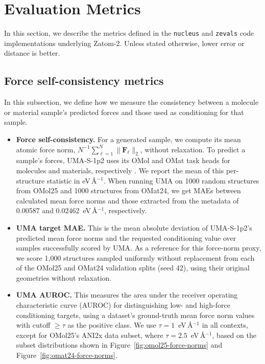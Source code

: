 \documentclass{article} %
\begin{document}
\section{Evaluation Metrics}
\label{app:evaluation-metrics}

In this section, we describe the metrics defined in the \texttt{nucleus}
and \texttt{zevals} code implementations underlying Zatom-2. Unless stated
otherwise, lower error or distance is better. 

\subsection{Force self-consistency metrics}
\label{app:force-sc-metrics}

In this subsection, we define how we measure the consistency between a molecule or material sample's predicted forces and those used as conditioning for that sample.

\begin{itemize}
    \item \textbf{Force self-consistency.} For a generated sample, we compute its mean atomic force norm, $N^{-1}\sum_{\ell=1}^{N}\lVert\mathbf F_\ell\rVert_2$, without relaxation. To predict a sample's forces, UMA-S-1p2 uses its OMol and OMat task heads for molecules and materials, respectively \citep{wood2025uma}. We report the mean of this per-structure statistic in eV\,\AA$^{-1}$. When running UMA on 1000 random structures from OMol25 and 1000 structures from OMat24, we get MAEs between calculated mean force norms and those extracted from the metadata of 0.00587 and 0.02462~eV\,\AA$^{-1}$, respectively.
    \item \textbf{UMA target MAE.} This is the mean absolute deviation of UMA-S-1p2's predicted mean force norms and the requested conditioning value over samples successfully scored by UMA. As a reference for this force-norm proxy, we score 1,000 structures sampled uniformly without replacement from each of the OMol25 and OMat24 validation splits (seed 42), using their original geometries without relaxation.
    \item \textbf{UMA AUROC.} This measures the area under the receiver operating characteristic curve (AUROC) for distinguishing low- and high-force conditioning targets, using a dataset's ground-truth mean force norm values with cutoff $\geq\tau$ as the positive class. We use $\tau=1$~eV\,\AA$^{-1}$ in all contexts, except for OMol25's ANI2x data subset, where $\tau=2.5$~eV\,\AA$^{-1}$, based on the subset distributions shown in Figure~\ref{fig:omol25-force-norms} and Figure~\ref{fig:omat24-force-norms}.
\end{itemize}
\end{document}
